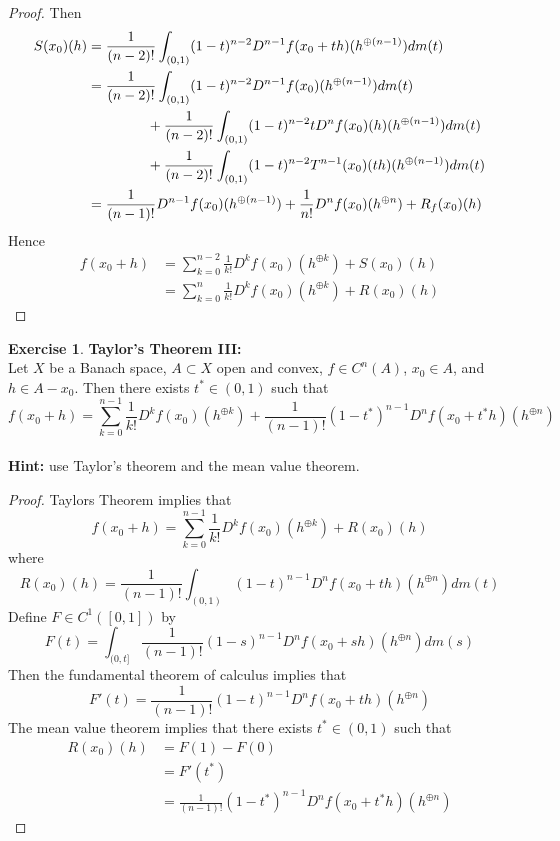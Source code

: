 \documentclass[12pt]{amsart}
\theoremstyle{definition}
\newtheorem{ex}[definition]{Exercise}
\newcommand{\lex}[1]{\label{ex:#1}}
\begin{document}
\begin{proof}
	Then 
	\begin{align*}
	S(x_0)(h) 
	&= \frac{1}{(n-2)!}\int_{(0,1)} (1-t)^{n-2}D^{n-1}f(x_0 + th)(h^{\oplus (n-1)})d m(t) \\
	&= \frac{1}{(n-2)!}\int_{(0,1)} (1-t)^{n-2} D^{n-1}f(x_0)(h^{\oplus (n-1)}) dm(t) \\ 
	& \hspace{1.5cm} + \frac{1}{(n-2)!} \int_{(0,1)} (1-t)^{n-2}t D^{n}f(x_0)(h)(h^{\oplus (n-1)}) dm(t) \\
	& \hspace{1.5cm} + \frac{1}{(n-2)!} \int_{(0,1)} (1-t)^{n-2}T^{n-1}(x_0)(th)(h^{\oplus (n-1)}) dm(t) \\
	&= \frac{1}{(n-1)!}D^{n-1}f(x_0)(h^{\oplus (n-1)}) + \frac{1}{n!}D^{n}f(x_0)(h^{\oplus n}) + R_f(x_0)(h)
	\end{align*}
	Hence 
	\begin{align*}
	f(x_0 + h) 
	&= \sum_{k=0}^{n-2} \frac{1}{k!} D^k f(x_0)(h^{\oplus k}) + S(x_0)(h) \\
	&= \sum_{k=0}^{n} \frac{1}{k!} D^k f(x_0)(h^{\oplus k}) + R(x_0)(h) 
	\end{align*}
	
	\end{proof}
	
	
	\begin{ex} \lex{} \textbf{Taylor's Theorem III:}\\
	Let $X$ be a Banach space, $A \subset X$ open and convex, $f \in C^{n}(A)$, $x_0 \in A$, and $h \in A - x_0$. Then there exists $t^* \in (0,1)$ such that $$f(x_0 + h) = \sum_{k=0}^{n-1} \frac{1}{k!} D^k f(x_0)(h^{\oplus k}) + \frac{1}{(n-1)!} (1-t^*)^{n-1}D^{n}f(x_0 + t^*h)(h^{\oplus n})$$ \\
	\textbf{Hint:} use Taylor's theorem and the mean value theorem.
	\end{ex}	
	
	\begin{proof}
	Taylors Theorem implies that 
	$$f(x_0 + h) = \sum_{k=0}^{n-1} \frac{1}{k!} D^k f(x_0)(h^{\oplus k}) + R(x_0)(h)$$ 
	where 
	$$R(x_0)(h) =  \frac{1}{(n-1)!}\int_{(0,1)} (1-t)^{n-1}D^{n}f(x_0 + th)(h^{\oplus n})d m(t)$$ 
	Define $F \in C^1([0,1])$ by $$F(t) = \int_{(0,t]}\frac{1}{(n-1)!}(1-s)^{n-1}D^{n}f(x_0 + sh)(h^{\oplus n})d m(s)$$ Then the fundamental theorem of calculus implies that 
	$$F'(t) = \frac{1}{(n-1)!}(1-t)^{n-1}D^{n}f(x_0 + th)(h^{\oplus n})$$ 
	The mean value theorem implies that there exists $t^* \in (0,1)$ such that 
	\begin{align*}
	R(x_0)(h)
	&= F(1) - F(0) \\
	&= F'(t^*) \\
	&= \frac{1}{(n-1)!}(1-t^*)^{n-1}D^{n}f(x_0 + t^*h)(h^{\oplus n})
	\end{align*}
	\end{proof}	
\end{document}
